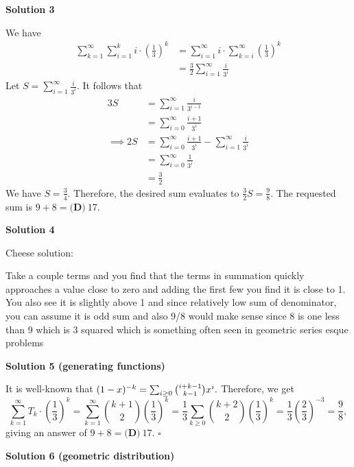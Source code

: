 \begin{enumerate}
\textbf{Solution 3}

We have\begin{align*}\sum_{k=1}^{\infty}\sum_{i=1}^{k}i\cdot\left(\frac{1}{3}\right)^k&=\sum_{i=1}^\infty i\cdot \sum_{k=i}^\infty\left(\frac{1}{3}\right)^k\\&=\frac{3}{2}\sum_{i=1}^\infty\frac{i}{3^i}\end{align*}
Let $S=\sum_{i=1}^\infty\frac{i}{3^i}$. It follows that\begin{align*}3S&=\sum_{i=1}^\infty\frac{i}{3^{i-1}}\\&=\sum_{i=0}^\infty\frac{i+1}{3^i}\\\implies 2S&=\sum_{i=0}^\infty\frac{i+1}{3^i}-\sum_{i=1}^\infty\frac{i}{3^i}\\&=\sum_{i=0}^\infty\frac{1}{3^i}\\&=\frac{3}{2}\end{align*}
We have $S=\frac{3}{4}$. Therefore, the desired sum evaluates to $\frac{3}{2}S=\frac{9}{8}$. The requested sum is $9+8=\boxed{\textbf{(D)}~17}.$




\textbf{Solution 4}

Cheese solution:

 Take a couple terms and you find that the terms in summation quickly approaches a value close to zero and adding the first few you find it is close to 1. You also see it is slightly above 1 and since relatively low sum of denominator, you can assume it is odd sum and also 9/8 would make sense since 8 is one less than 9 which is 3 squared which is something often seen in geometric series esque problems

 



\textbf{Solution 5 (generating functions)}

It is well-known that $(1-x)^{-k}=\sum_{i \ge 0} \tbinom{i+k-1}{k-1} x^i.$ Therefore, we get 
 \[\sum_{k=1}^{\infty} T_k \cdot \left(\frac{1}{3}\right)^k = \sum_{k=1}^{\infty} \binom{k+1}{2} \left(\frac{1}{3}\right)^k = \frac{1}{3} \sum_{k \ge 0} \binom{k+2}{2} \left(\frac{1}{3}\right)^k = \frac{1}{3} \left(\frac{2}{3}\right)^{-3} = \frac{9}{8},\] giving an answer of $9+8=\boxed{\textbf{(D)}~17}$. $\square$




\textbf{Solution 6 (geometric distribution)}


\end{enumerate}

